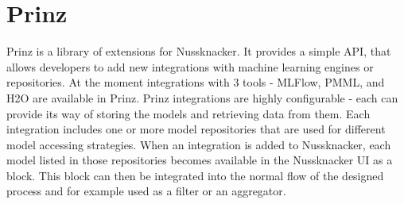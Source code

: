\section{Prinz}

Prinz is a library of extensions for Nussknacker.
It provides a simple API, that allows developers to add new integrations with machine learning engines or repositories.
At the moment integrations with 3 tools - MLFlow, PMML, and H2O are available in Prinz.
Prinz integrations are highly configurable - each can provide its way of storing the models and retrieving data from them.
Each integration includes one or more model repositories that are used for different model accessing strategies.
When an integration is added to Nussknacker, each model listed in those repositories becomes available in the Nussknacker UI as a block.
This block can then be integrated into the normal flow of the designed process and for example used as a filter or an aggregator.
